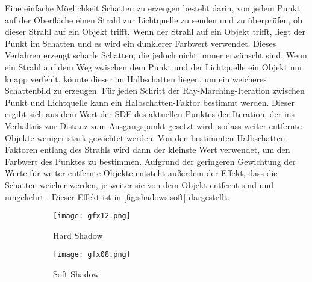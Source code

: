 Eine einfache Möglichkeit Schatten zu erzeugen besteht darin, von jedem Punkt auf der Oberfläche einen Strahl zur Lichtquelle zu senden und zu überprüfen, ob dieser Strahl auf ein Objekt trifft.
Wenn der Strahl auf ein Objekt trifft, liegt der Punkt im Schatten und es wird ein dunklerer Farbwert verwendet.
Dieses Verfahren erzeugt scharfe Schatten, die jedoch nicht immer erwünscht sind.
Wenn ein Strahl auf dem Weg zwischen dem Punkt und der Lichtquelle ein Objekt nur knapp verfehlt, könnte dieser im Halbschatten liegen, um ein weicheres Schattenbild zu erzeugen.
Für jeden Schritt der Ray-Marching-Iteration zwischen Punkt und Lichtquelle kann ein Halbschatten-Faktor bestimmt werden.
Dieser ergibt sich aus dem Wert der SDF des aktuellen Punktes der Iteration, der ins Verhältnis zur Distanz zum Ausgangspunkt gesetzt wird, sodass weiter entfernte Objekte weniger stark gewichtet werden.
Von den bestimmten Halbschatten-Faktoren entlang des Strahls wird dann der kleinste Wert verwendet, um den Farbwert des Punktes zu bestimmen.
Aufgrund der geringeren Gewichtung der Werte für weiter entfernte Objekte entsteht außerdem der Effekt, dass die Schatten weicher werden, je weiter sie von dem Objekt entfernt sind und umgekehrt \cite{iquilezles_rmshadows}.
Dieser Effekt ist in \autoref{fig:shadows:soft} dargestellt.

\begin{figure}[!htbp]\centering
    \begin{subfigure}[t]{0.2\textwidth}
        \texttt{[image: gfx12.png]}
        \caption{Hard Shadow}
        \label{fig:shadows:hard}
    \end{subfigure}
    \hfill
    \begin{subfigure}[t]{0.2\textwidth}
        \centering
        \texttt{[image: gfx08.png]}
        \caption{Soft Shadow}
        \label{fig:shadows:soft}
    \end{subfigure}
    \caption{\cite{iquilezles_rmshadows}}
    \label{fig:shadows}
\end{figure}


